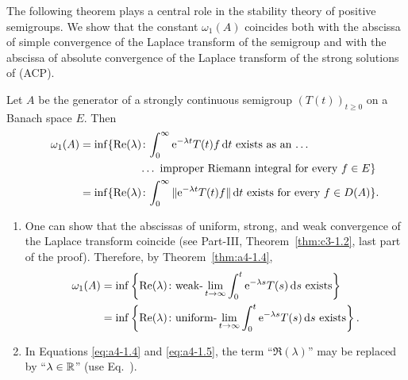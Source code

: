 The following theorem plays a central role in the stability theory of positive semigroups.
We show that the constant $\omega_{1}(A)$ coincides both with the abscissa of simple convergence of the Laplace transform of the semigroup and with the abscissa of absolute convergence of the Laplace transform of the strong solutions of (ACP).
\begin{theorem}\label{thm:a4-1.4}
Let $A$ be the generator of a strongly continuous semigroup $ (T(t))_{t \geq 0} $ on a Banach space $E$. 
Then
\begin{equation}\label{eq:a4-1.4}
\begin{split}
\omega_{1}(A) = \inf\{\Re(\lambda) &\colon {\int_{0}^{\infty} \eu^{-\lambda t} T(t)f  \dt} \text{\ exists as an\  \ldots }\\
	\phantom{\inf\{\Re(\lambda) \colon exists as an} &\text{\ldots\  improper Riemann integral for every } f \in E\} \\
= \inf\{\Re(\lambda) &\colon {\int_{0}^{\infty} \|\eu^{-\lambda t} T(t)f\|  \dt} \text{ exists for every } f \in D(A)\}.  
\end{split}
\end{equation}
\end{theorem}
\begin{remarks*}\label{rem:a4-1.4}%
\begin{enumerate}[\upshape (i), wide, labelindent=.25em]

\item 
One can show that the abscissas of uniform, strong, and weak convergence of the Laplace transform coincide (see Part-III, Theorem~\ref{thm:c3-1.2}, last part of the proof). 
Therefore, by Theorem~\ref{thm:a4-1.4},
\begin{equation}\label{eq:a4-1.5}
\begin{split}
\omega_1(A) &= \inf \left\{ \mathop{}\!\mathrm{Re}(\lambda)\colon\text{weak-} \lim_{t \to \infty} {\int_0^t \mathrm{e}^{-\lambda s} T(s)  \mathop{}\!\mathrm{d}{s}} \text{ exists} \right\} \\
    &= \inf \left\{ \mathop{}\!\mathrm{Re}(\lambda)\colon\text{uniform-} \lim_{t \to \infty} {\int_0^t \mathrm{e}^{-\lambda s} T(s)  \mathop{}\!\mathrm{d}{s}} \text{ exists} \right\} .
\end{split}
\end{equation}
\item
In Equations \eqref{eq:a4-1.4} and \eqref{eq:a4-1.5}, the term \enquote{$\Re(\lambda)$} may be replaced by \enquote{$\lambda \in \mathbb{R}$} (use Eq.~).
\end{enumerate}
\end{remarks*}
